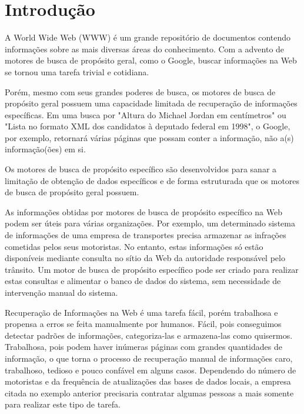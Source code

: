 \chapter{Introdução}
\thispagestyle{fancy}

A World Wide Web (WWW) é um grande repositório de documentos contendo informações sobre as mais diversas áreas do conhecimento. Com a advento de motores de busca de propósito geral, como o Google, buscar informações na Web se tornou uma tarefa trivial e cotidiana.

Porém, mesmo com seus grandes poderes de busca, os motores de busca de propósito geral possuem uma capacidade limitada de recuperação de informações específicas. Em uma busca por "Altura do Michael Jordan em centímetros" ou "Lista no formato XML dos candidatos à deputado federal em 1998", o Google, por exemplo, retornará várias páginas que possam conter a informação, não a(s) informação(ões) em si.

Os motores de busca de propósito específico são desenvolvidos para sanar a limitação de obtenção de dados específicos e de forma estruturada que os motores de busca de propósito geral possuem.

As informações obtidas por motores de busca de propósito específico na Web podem ser úteis para várias organizações. Por exemplo, um determinado sistema de informações de uma empresa de transportes precisa armazenar as infrações cometidas pelos seus motoristas. No entanto, estas informações só estão disponíveis mediante consulta no sítio da Web da autoridade responsável pelo trânsito. Um motor de busca de propósito específico pode ser criado para realizar estas consultas e alimentar o banco de dados do sistema, sem necessidade de intervenção manual do sistema.


Recuperação de Informações na Web é uma tarefa fácil, porém trabalhosa e propensa a erros se feita manualmente por humanos. Fácil, pois conseguimos detectar padrões de informações, categoriza-las e armazena-las como quisermos. Trabalhosa, pois podem haver inúmeras páginas com grandes quantidades de informação, o que torna o processo de recuperação manual de informações caro, trabalhoso, tedioso e pouco confável em alguns casos. Dependendo do número de motoristas e da frequência de atualizações das bases de dados locais, a empresa citada no exemplo anterior precisaria contratar algumas pessoas a mais somente para realizar este tipo de tarefa.

